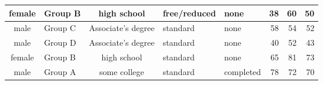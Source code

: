 \documentclass{article}
\begin{document}
\begin{sidewaystable}[h!]
\begin{center}
\begin{tabular}{|c|l|c|l|l|r|r|r|}
		\hline
		
		female & Group B & high school & free/reduced & none & 38 & 60 & 50\\
		
		\hline
		
		male & Group C & Associate's degree & standard & none & 58 & 54 & 52\\
		
		\hline
		
		male & Group D & Associate's degree & standard & none & 40 & 52 & 43\\
		
		\hline
		
		female & Group B & high school & standard & none & 65 & 81 & 73\\
		
		\hline
		
		male & Group A & some college & standard & completed & 78 & 72 & 70\\  
		
		\hline 
			\end{tabular}
		\end{center}
	\end{sidewaystable}
\end{document}
